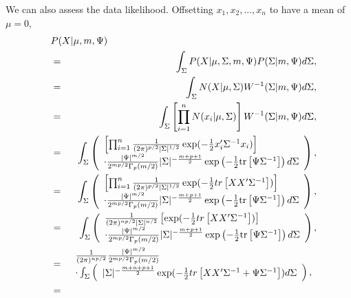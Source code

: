 We can also assess the data likelihood. Offsetting $x_1, x_2, ..., x_n$ to have a mean of $\mu=0$,
\begin{eqnarray}
\lefteqn{P(X|\mu, m, \Psi)}\\
\ \ \ &=& \int_\Sigma P(X|\mu, \Sigma, m,\Psi)P(\Sigma|m,\Psi) d\Sigma,\\
 &=& \int_\Sigma N(X|\mu,\Sigma)W^{-1}(\Sigma|m,\Psi) d\Sigma,\\
 &=& \int_\Sigma \left[\prod_{i=1}^n N(x_i|\mu,\Sigma)\right]W^{-1}(\Sigma|m,\Psi) d\Sigma,\\
%
 &=& \int_\Sigma  \left(\begin{array}{l}
 \left[\prod_{i=1}^n
 \frac{1}{(2\pi)^{p/2} |\Sigma|^{1/2}} \exp(-\frac 1 2 x_i'\Sigma^{-1}x_i)
 \right]\\
\cdot \frac{|\Psi|^{m/2}}{2^{mp/2}\Gamma_p(m/2)}|\Sigma|^{-\frac{m+p+1}{2}}\exp\left(- \frac 1 2 \mbox{tr}\left[\Psi\Sigma^{-1}\right]\right) d\Sigma
\end{array}\right), \\
%
 &=& \int_\Sigma  \left(\begin{array}{l}
 \left[\prod_{i=1}^n
 \frac{1}{(2\pi)^{p/2} |\Sigma|^{1/2}} \exp(-\frac 1 2 tr\left[XX'\Sigma^{-1}\right])
 \right]\\
\cdot \frac{|\Psi|^{m/2}}{2^{mp/2}\Gamma_p(m/2)}|\Sigma|^{-\frac{m+p+1}{2}}\exp\left(- \frac 1 2 \mbox{tr}\left[\Psi\Sigma^{-1}\right]\right) d\Sigma
\end{array}\right), \\
%
 &=& \int_\Sigma \left(\begin{array}{l}
 \frac{1}{(2\pi)^{n p/2} |\Sigma|^{n/2}} 
 \left[
 \exp(-\frac 1 2 tr\left[XX'\Sigma^{-1}\right])
 \right]\\
\cdot \frac{|\Psi|^{m/2}}{2^{mp/2}\Gamma_p(m/2)}|\Sigma|^{-\frac{m+p+1}{2}}\exp\left(- \frac 1 2 \mbox{tr}\left[\Psi\Sigma^{-1}\right]\right) d\Sigma
\end{array} \right),\\
%
 &=& 
 \begin{array}{l}
 \frac{1}{(2\pi)^{n p/2}} \frac{|\Psi|^{m/2}}{2^{mp/2}\Gamma_p(m/2)} \\
 \cdot \int_\Sigma \left(\begin{array}{l}
 |\Sigma|^{-\frac{m+n+p+1}{2}}
 \exp(-\frac 1 2 tr\left[XX'\Sigma^{-1} + \Psi\Sigma^{-1}\right])
 d\Sigma
\end{array} \right),
\end{array} \\
%
 &=& 
 \begin{array}{l}

\end{array}
\end{eqnarray}

